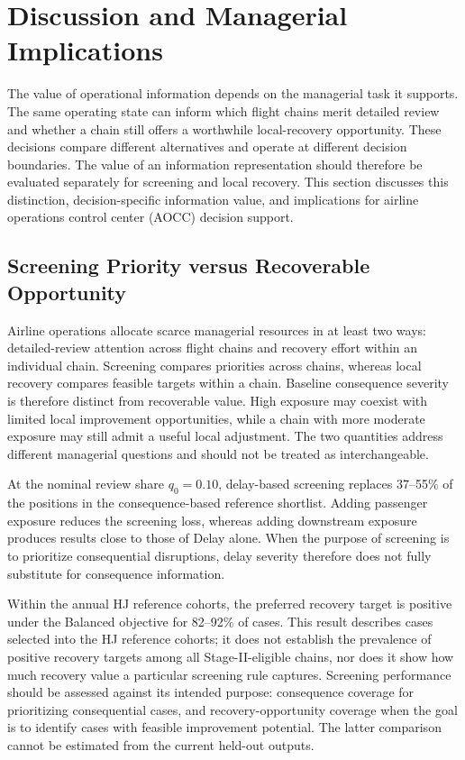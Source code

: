 \section{Discussion and Managerial Implications}
\label{sec:discussion}

The value of operational information depends on the managerial task it supports. The same operating state can inform which flight chains merit detailed review and whether a chain still offers a worthwhile local-recovery opportunity. These decisions compare different alternatives and operate at different decision boundaries. The value of an information representation should therefore be evaluated separately for screening and local recovery. This section discusses this distinction, decision-specific information value, and implications for airline operations control center (AOCC) decision support.

\subsection{Screening Priority versus Recoverable Opportunity}
\label{subsec:distinct_allocation}

Airline operations allocate scarce managerial resources in at least two ways: detailed-review attention across flight chains and recovery effort within an individual chain. Screening compares priorities across chains, whereas local recovery compares feasible targets within a chain. Baseline consequence severity is therefore distinct from recoverable value. High exposure may coexist with limited local improvement opportunities, while a chain with more moderate exposure may still admit a useful local adjustment. The two quantities address different managerial questions and should not be treated as interchangeable.

At the nominal review share $q_0=0.10$, delay-based screening replaces 37--55\% of the positions in the consequence-based reference shortlist. Adding passenger exposure reduces the screening loss, whereas adding downstream exposure produces results close to those of Delay alone. When the purpose of screening is to prioritize consequential disruptions, delay severity therefore does not fully substitute for consequence information.

Within the annual HJ reference cohorts, the preferred recovery target is positive under the Balanced objective for 82--92\% of cases. This result describes cases selected into the HJ reference cohorts; it does not establish the prevalence of positive recovery targets among all Stage-II-eligible chains, nor does it show how much recovery value a particular screening rule captures. Screening performance should be assessed against its intended purpose: consequence coverage for prioritizing consequential cases, and recovery-opportunity coverage when the goal is to identify cases with feasible improvement potential. The latter comparison cannot be estimated from the current held-out outputs.

